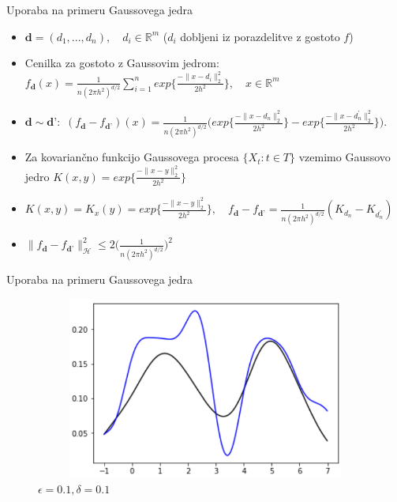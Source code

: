 \documentclass{beamer}
\begin{document}
\begin{frame}{Uporaba na primeru Gaussovega jedra}
\begin{itemize}
\item $\textbf{d} = (d_1,...,d_n), \quad d_i \in \mathbb{R}^m$ ($d_i$ dobljeni iz porazdelitve z gostoto $f$)
\item Cenilka za gostoto z Gaussovim jedrom: $f_{\textbf{d}}(x) = \frac{1}{n(2\pi h^2)^{d/2}} \sum_{i=1}^{n} exp\Big\{\frac{-\|x-d_i\|_{2}^{2}}{2h^2}\Big\},  \quad x \in \mathbb{R}^m$
\item $\textbf{d} \sim \textbf{d'}:$ $
(f_{\textbf{d}} - f_{\textbf{d'}})(x) = \frac{1}{n(2\pi h^2)^{d/2}} \Big(exp\Big\{\frac{-\|x-d_n\|_{2}^{2}}{2h^2}\Big\}-exp\Big\{\frac{-\|x-d_{n}^{\prime}\|_{2}^{2}}{2h^2}\Big\}\Big).
$
\item Za kovariančno funkcijo Gaussovega procesa $\{X_t : t \in T \}$ vzemimo Gaussovo jedro $K(x,y) = exp\{\frac{-\|x-y\|_{2}^{2}}{2h^2}\}$
\item $K(x,y) = K_x(y) = exp\{\frac{-\|x-y\|_{2}^{2}}{2h^2}\}, \quad f_{\textbf{d}} - f_{\textbf{d'}} = \frac{1}{n(2\pi h^2)^{d/2}} (K_{d_n}-K_{d_{n}^{\prime}})$
\item $\|f_{\textbf{d}} - f_{\textbf{d'}}\|_{\mathcal{H}}^{2} \leq  2 \Big(\frac{1}{n(2\pi h^2)^{d/2}}\Big)^2$
\end{itemize}
\end{frame}

\begin{frame}{Uporaba na primeru Gaussovega jedra}
\begin{figure}
\centering
\includegraphics[width = 12cm, height = 6cm]{prva}
\caption{$\epsilon = 0.1, \delta = 0.1$}
\end{figure}

\end{frame}
\end{document}

